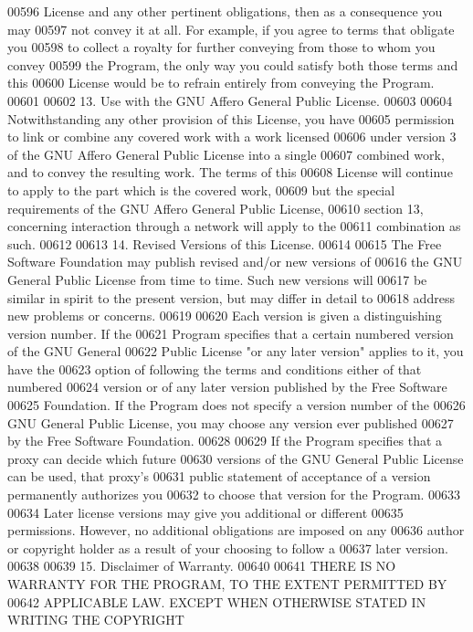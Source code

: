 \begin{DoxyCode}
00596 License and any other pertinent obligations, then as a consequence you may
00597 not convey it at all.  For example, if you agree to terms that obligate you
00598 to collect a royalty for further conveying from those to whom you convey
00599 the Program, the only way you could satisfy both those terms and this
00600 License would be to refrain entirely from conveying the Program.
00601 
00602   13. Use with the GNU Affero General Public License.
00603 
00604   Notwithstanding any other provision of this License, you have
00605 permission to link or combine any covered work with a work licensed
00606 under version 3 of the GNU Affero General Public License into a single
00607 combined work, and to convey the resulting work.  The terms of this
00608 License will continue to apply to the part which is the covered work,
00609 but the special requirements of the GNU Affero General Public License,
00610 section 13, concerning interaction through a network will apply to the
00611 combination as such.
00612 
00613   14. Revised Versions of this License.
00614 
00615   The Free Software Foundation may publish revised and/or new versions of
00616 the GNU General Public License from time to time.  Such new versions will
00617 be similar in spirit to the present version, but may differ in detail to
00618 address new problems or concerns.
00619 
00620   Each version is given a distinguishing version number.  If the
00621 Program specifies that a certain numbered version of the GNU General
00622 Public License "or any later version" applies to it, you have the
00623 option of following the terms and conditions either of that numbered
00624 version or of any later version published by the Free Software
00625 Foundation.  If the Program does not specify a version number of the
00626 GNU General Public License, you may choose any version ever published
00627 by the Free Software Foundation.
00628 
00629   If the Program specifies that a proxy can decide which future
00630 versions of the GNU General Public License can be used, that proxy's
00631 public statement of acceptance of a version permanently authorizes you
00632 to choose that version for the Program.
00633 
00634   Later license versions may give you additional or different
00635 permissions.  However, no additional obligations are imposed on any
00636 author or copyright holder as a result of your choosing to follow a
00637 later version.
00638 
00639   15. Disclaimer of Warranty.
00640 
00641   THERE IS NO WARRANTY FOR THE PROGRAM, TO THE EXTENT PERMITTED BY
00642 APPLICABLE LAW.  EXCEPT WHEN OTHERWISE STATED IN WRITING THE COPYRIGHT

\end{DoxyCode}
